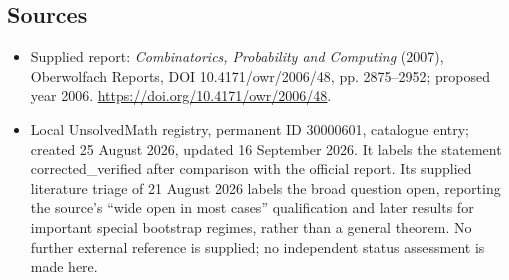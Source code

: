 \documentclass[11pt]{article}
\begin{document}
\subsection{Sources}
\begin{itemize}
\item Supplied report: \emph{Combinatorics, Probability and Computing} (2007), Oberwolfach Reports, DOI 10.4171/owr/2006/48, pp. 2875--2952; proposed year 2006. \url{https://doi.org/10.4171/owr/2006/48}.
\item Local UnsolvedMath registry, permanent ID 30000601, catalogue entry; created 25 August 2026, updated 16 September 2026. It labels the statement corrected\_verified after comparison with the official report. Its supplied literature triage of 21 August 2026 labels the broad question open, reporting the source's ``wide open in most cases'' qualification and later results for important special bootstrap regimes, rather than a general theorem. No further external reference is supplied; no independent status assessment is made here.
\end{itemize}
\end{document}
